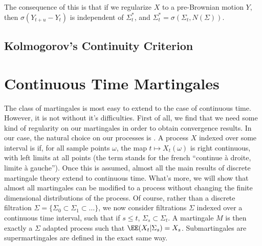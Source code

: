 The consequence of this is that if we regularize $X$ to a \cadlag pre-Brownian motion $Y$, then $\sigma(Y_{t+u} - Y_t)$ is independent of $\Sigma^*_t$, and $\Sigma^*_t = \sigma(\Sigma_t, N(\Sigma))$.

\section{Kolmogorov's Continuity Criterion}

\chapter{Continuous Time Martingales}

The class of martingales is most easy to extend to the case of continuous time. However, it is not without it's difficulties. First of all, we find that we need some kind of regularity on our martingales in order to obtain convergence results. In our case, the natural choice on our processes is {\it \cadlag}. A process $X$ indexed over some interval is \cadlag if, for all sample points $\omega$, the map $t \mapsto X_t(\omega)$ is right continuous, with left limits at all points (the term \cadlag stands for the french ``continue \`{a} droite, limite \`{a} gauche''). Once this is assumed, almost all the main results of discrete martingale theory extend to continuous time. What's more, we will show that almost all martingales can be modified to a \cadlag process without changing the finite dimensional distributions of the process. Of course, rather than a discrete filtration $\Sigma = \{ \Sigma_0 \subset \Sigma_1 \subset \dots \}$, we now consider filtrations $\Sigma$ indexed over a continuous time interval, such that if $s \leq t$, $\Sigma_s \subset \Sigma_t$. A martingale $M$ is then exactly a $\Sigma$ adapted process such that $\EE(X_t|\Sigma_s) = X_s$. Submartingales are supermartingales are defined in the exact same way.


